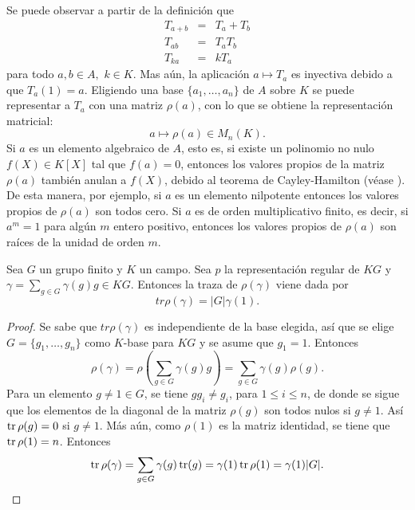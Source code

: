 Se puede observar a partir de la definición que
\begin{eqnarray*}
T_{a+b} &=& T_a + T_b \\
T_{ab} &=& T_aT_b \\
T_{ka} &=& kT_a
\end{eqnarray*}
para todo $a,b \in A,$  $k\in K$. Mas aún, la aplicación $a \mapsto T_a$ es inyectiva debido a que $T_a(1) = a$. Eligiendo una base $\{ a_1, \dots, a_n \}$ de $A$ sobre $K$ se puede representar a $T_a$ con una matriz $\rho(a)$, con lo que  se obtiene la representación matricial:
\begin{equation*}
a \mapsto \rho(a) \in M_n(K).
\end{equation*}
Si $a$ es un elemento algebraico de $A$, esto es, si existe un polinomio no nulo $f(X) \in K[X]$ tal que $f(a) = 0$, entonces los valores propios de la matriz $\rho(a)$ también anulan a $f(X)$, debido al teorema de Cayley-Hamilton (véase \cite[p 241]{bib:lang}). De esta manera, por ejemplo, si $a$ es un elemento nilpotente entonces los valores propios de $\rho(a)$ son todos cero. Si $a$ es de orden multiplicativo finito, es decir, si $a^m = 1$ para algún $m$ entero positivo, entonces los valores propios de $\rho(a)$ son raíces de la unidad de orden $m$. 
\begin{lema}\label{lem:traza}
Sea $G$ un grupo finito y $K$ un campo. Sea $p$ la representación regular de $KG$ y $\gamma = \sum_{g \in G}\gamma(g)g \in KG$. Entonces la traza de $\rho(\gamma)$ viene dada por
\begin{equation*}
tr\rho(\gamma) = |G|\gamma(1).
\end{equation*}
\end{lema} 
\begin{proof}
Se sabe que $tr\rho(\gamma)$ es independiente de la base elegida, así que se elige $G=\{g_1, \dots, g_n \}$ como $K$-base para $KG$ y se asume que $g_1=1$.
Entonces
\begin{equation*}
\rho(\gamma) = \rho\left( \sum_{g \in G}\gamma(g)g \right) = \sum_{g \in G}\gamma(g)\rho(g) .
\end{equation*}
Para un elemento $g\neq 1 \in G$, se tiene $gg_i \neq g_i$, para $1\leq i\leq n$, de donde se sigue que los elementos de la diagonal de la matriz $\rho(g)$ son todos nulos si $g \neq 1$. Así $\operatorname{tr}\rho(g) = 0$ si $g \neq 1$. Más aún, como $\rho(1)$ es la matriz identidad, se tiene que $\operatorname{tr}\rho(1) = n$. Entonces
\begin{equation*}
\operatorname{tr}\rho(\gamma) = \sum_{g \in G}\gamma(g)\operatorname{tr}(g) = \gamma(1)\operatorname{tr}\rho(1) = \gamma(1)|G|.
\end{equation*} 
\end{proof}

